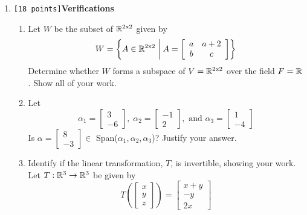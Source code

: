 \documentclass[10pt]{article}
\begin{document}
\begin{enumerate}
\item \verb![18 points]!\textbf{Verifications} \\
    \vspace{-3mm}
    \begin{enumerate}
        \item Let $W$ be the subset of $\mathbb{R}^{2\text{x}2}$ given by
        \[
            W = \left\{ A\in\mathbb{R}^{2\text{x}2 } \; \middle| \; A = \left[
                                                \begin{array}{cc}
                                                    a & a + 2 \\ 
                                                    b & c
                                                \end{array}
                                                \right]\right\}
        \]
        Determine whether $W$ forms a subspace of $V = \mathbb{R}^{2\text{x}2}$ over the field $F = \mathbb{R}$. Show all of your work.
        \item Let
        \[
            \alpha_1 = \left[
                \begin{array}{c}
                    3 \\
                    -6
                \end{array}\right],\; \alpha_2 = \left[
                \begin{array}{c}
                    -1 \\
                    2
                \end{array}\right],\text{ and } \alpha_3 = \left[
                \begin{array}{c}
                    1 \\
                    -4
                \end{array}\right]
        \]
        Is $\alpha = \left[
                \begin{array}{c}
                    8 \\
                    -3
                \end{array}\right] \in$ \;Span($\alpha_1,\alpha_2,\alpha_3$)? Justify your answer.
        \item Identify if the linear transformation, $T$, is invertible, showing your work. Let $T : \mathbb{R}^3\rightarrow\mathbb{R}^3$ be given by
                \[
                    T\left(\left[
                        \begin{array}{c}
                            x \\
                            y \\
                            z
                        \end{array}\right]\right) = \left[
                        \begin{array}{c}
                            x + y \\
                            -y \\
                            2x
                        \end{array}\right]
                \]
    \end{enumerate}


\end{enumerate}
\end{document}

